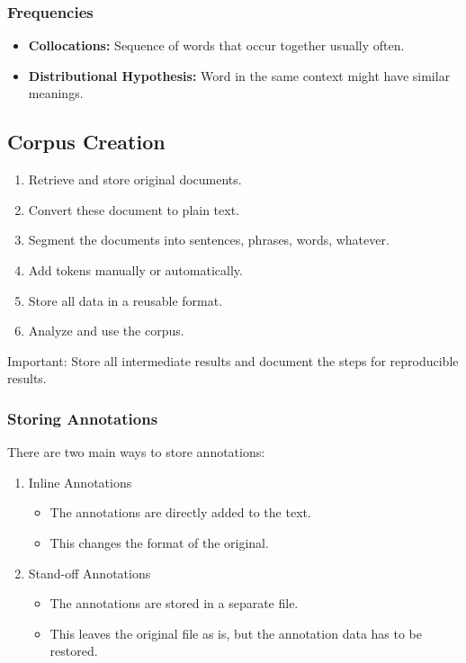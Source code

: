 \documentclass[a4paper, 11pt, accentcolor = tud3b]{tudreport}
\begin{document}
                \subsubsection{Frequencies} %
                	\begin{itemize}
                		\item \textbf{Collocations:} Sequence of words that occur together usually often.
                		\item \textbf{Distributional Hypothesis:} Word in the same context might have similar meanings.
                	\end{itemize}

            \subsection{Corpus Creation} %
                \begin{enumerate}
                	\item Retrieve and store original documents.
                	\item Convert these document to plain text.
                	\item Segment the documents into sentences, phrases, words, whatever.
                	\item Add tokens manually or automatically.
                	\item Store all data in a reusable format.
                	\item Analyze and use the corpus.
                \end{enumerate}
            	Important: Store all intermediate results and document the steps for reproducible results.

                \subsubsection{Storing Annotations} %
                    There are two main ways to store annotations:
                    \begin{enumerate}
                    	\item Inline Annotations
                    		\begin{itemize}
                    			\item The annotations are directly added to the text.
                    			\item This changes the format of the original.
                    		\end{itemize}
                    	\item Stand-off Annotations
                    		\begin{itemize}
                    			\item The annotations are stored in a separate file.
                    			\item This leaves the original file as is, but the annotation data has to be restored.
                    		\end{itemize}
                    \end{enumerate}
\end{document}
